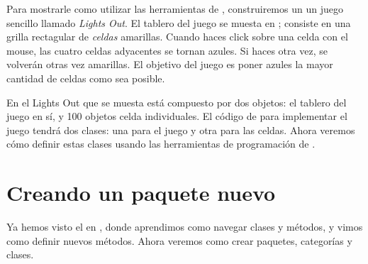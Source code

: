 \documentclass[a4paper,10pt,twoside]{book}
\begin{document}

Para mostrarle como utilizar las herramientas de \pharo, construiremos un un juego
sencillo llamado \emph{Lights Out}. El tablero del juego se muesta en ;
consiste en una grilla rectagular de \emph{celdas} amarillas. Cuando haces click
sobre una celda con el mouse, las cuatro celdas adyacentes se tornan azules. Si
haces \Click otra vez, se volverán otras vez amarillas. El objetivo del juego
es poner azules la mayor cantidad de celdas como sea posible.


En el Lights Out que se muesta  está compuesto por
dos objetos: el tablero del juego en sí, y 100 objetos celda individuales. El
código de \pharo para implementar el juego tendrá dos clases: una para el
juego y otra para las celdas. Ahora veremos cómo definir estas clases usando
las herramientas de programación de \pharo.

\section{Creando un paquete nuevo}


Ya hemos visto el  en , donde aprendimos como
navegar clases y métodos, y vimos como definir nuevos métodos. Ahora veremos
como crear paquetes, categorías y clases.


\end{document}
